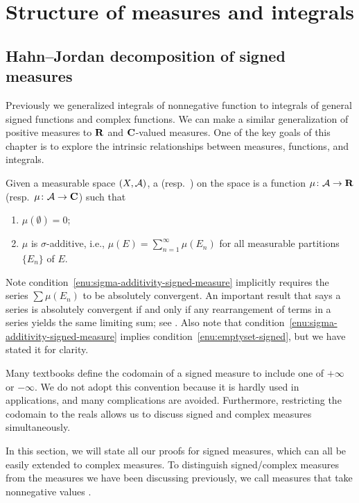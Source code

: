 \chapter{Structure of measures and integrals}
\section{Hahn--Jordan decomposition of signed measures} \label{sec:signed}
Previously we generalized integrals of nonnegative function to integrals of general signed functions and complex functions. We can make a similar generalization of positive measures to $\mathbf{R}$ and $\mathbf{C}$-valued measures. One of the key goals of this chapter is to explore the intrinsic relationships between measures, functions, and integrals.
\begin{defn}
    Given a measurable space $(X,\mathcal{A})$, a  (resp.\ ) on the space is a function $\mu\colon \mathcal{A} \to \mathbf{R}$ (resp.\ $\mu\colon \mathcal{A} \to \mathbf{C}$) such that \begin{enumerate}
        \item \label{enu:emptyset-signed}$\mu(\emptyset) = 0$; 
        \item \label{enu:sigma-additivity-signed-measure} $\mu$ is $\sigma$-additive, i.e., $\mu(E) = \sum_{n=1}^\infty \mu(E_n)$ for all measurable partitions $\{E_n\}$ of $E$.
    \end{enumerate}
\end{defn}

Note condition~\ref{enu:sigma-additivity-signed-measure} implicitly requires the series $\sum \mu(E_n)$ to be absolutely convergent. An important result that says a series is absolutely convergent if and only if any rearrangement of terms in a series yields the same limiting sum; see \cite[Theorems~3.54 and 3.55]{Rudin_principles_1976}. Also note that condition~\ref{enu:sigma-additivity-signed-measure} implies condition~\ref{enu:emptyset-signed}, but we have stated it for clarity.

Many textbooks define the codomain of a signed measure to include one of $+\infty$ or $-\infty$. We do not adopt this convention because it is hardly used in applications, and many complications are avoided. Furthermore, restricting the codomain to the reals allows us to discuss signed and complex measures simultaneously.

In this section, we will state all our proofs for signed measures, which can all be easily extended to complex measures. To distinguish signed/complex measures from the measures we have been discussing previously, we call measures that take nonnegative values .

